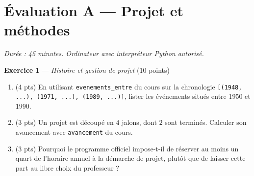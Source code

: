 \section*{Évaluation A --- Projet et méthodes}
\textit{Durée : 45 minutes. Ordinateur avec interpréteur Python autorisé.}


\bigskip

\textbf{Exercice 1} --- \textit{Histoire et gestion de projet} \hfill (10 points)

\begin{enumerate}
  \item (4 pts) En utilisant \lstinline{evenements_entre} du cours sur la chronologie \lstinline{[(1948, ...), (1971, ...), (1989, ...)]}, lister les événements situés entre 1950 et 1990.
  \item (3 pts) Un projet est découpé en $4$ jalons, dont $2$ sont terminés. Calculer son avancement avec \lstinline{avancement} du cours.
  \item (3 pts) Pourquoi le programme officiel impose-t-il de réserver au moins un quart de l'horaire annuel à la démarche de projet, plutôt que de laisser cette part au libre choix du professeur ?
\end{enumerate}


\bigskip

